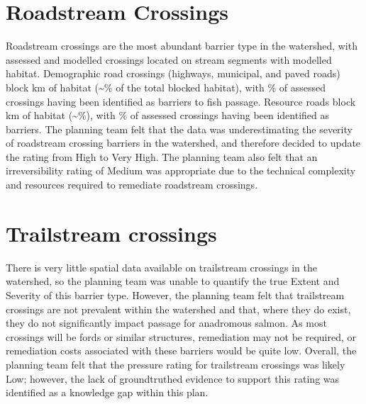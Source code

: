 \documentclass[letterpaper,10pt,english]{jupyterBook}
\begin{document}
\section{Road\sphinxhyphen{}stream Crossings}
\label{\detokenize{EcoAttributes:road-stream-crossings}}
\sphinxAtStartPar
Road\sphinxhyphen{}stream crossings are the most abundant barrier type in the watershed, with  assessed and modelled crossings located on stream segments with modelled habitat. Demographic road crossings (highways, municipal, and paved roads) block  km of habitat (\textasciitilde{}\% of the total blocked habitat), with \% of assessed crossings having been identified as barriers to fish passage. Resource roads block  km of habitat (\textasciitilde{}\%), with \% of assessed crossings having been identified as barriers. The planning team felt that the data was underestimating the severity of road\sphinxhyphen{}stream crossing barriers in the watershed, and therefore decided to update the rating from High to Very High. The planning team also felt that an irreversibility rating of Medium was appropriate due to the technical complexity and resources required to remediate road\sphinxhyphen{}stream crossings.


\section{Trail\sphinxhyphen{}stream crossings}
\label{\detokenize{EcoAttributes:trail-stream-crossings}}
\sphinxAtStartPar
There is very little spatial data available on trail\sphinxhyphen{}stream crossings in the watershed, so the planning team was unable to quantify the true Extent and Severity of this barrier type. However, the planning team felt that trail\sphinxhyphen{}stream crossings are not prevalent within the watershed and that, where they do exist, they do not significantly impact passage for anadromous salmon. As most crossings will be fords or similar structures, remediation may not be required, or remediation costs associated with these barriers would be quite low. Overall, the planning team felt that the pressure rating for trail\sphinxhyphen{}stream crossings was likely Low; however, the lack of ground\sphinxhyphen{}truthed evidence to support this rating was identified as a knowledge gap within this plan.
\end{document}
